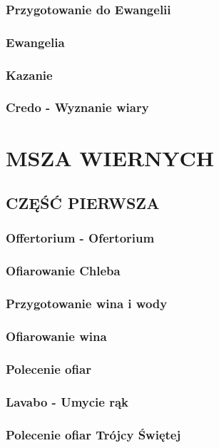 \documentclass[10pt,titlepage]{article}
\begin{document}
	\subsubsection{Przygotowanie do Ewangelii}
	\subsubsection{Ewangelia}
	\subsubsection{Kazanie}
	\subsubsection{Credo - Wyznanie wiary}
	
	\section{MSZA WIERNYCH}
	
	\subsection{CZĘŚĆ PIERWSZA}
	
	\subsubsection{Offertorium - Ofertorium}
	\subsubsection{Ofiarowanie Chleba}
	\subsubsection{Przygotowanie wina i wody}
	\subsubsection{Ofiarowanie wina}
	\subsubsection{Polecenie ofiar}
	\subsubsection{Lavabo - Umycie rąk}
	\subsubsection{Polecenie ofiar Trójcy Świętej}
\end{document}
